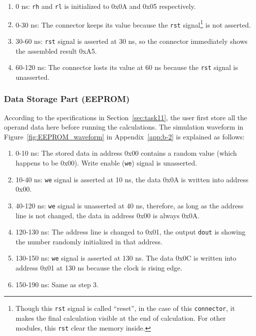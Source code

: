 \documentclass[11pt]{article}
\begin{document}
\begin{enumerate}
	\item 0 ns: \texttt{rh} and \texttt{rl} is initialized to 0x0A and 0x05 respectively.
	\item 0-30 ns: The connector keeps its value because the \texttt{rst} signal\footnote{Though this \texttt{rst} signal is called ``reset'', in the case of this \texttt{connector}, it makes the final calculation visible at the end of calculation. For other modules, this \texttt{rst} clear the memory inside.} is not asserted.
	\item 30-60 ns: \texttt{rst} signal is asserted at 30 ns, so the connector immediately shows the assembled result 0xA5.
	\item 60-120 ns: The connector losts its value at 60 ns because the \texttt{rst} signal is unasserted.
\end{enumerate}

\subsubsection{Data Storage Part (EEPROM)}

According to the specifications in Section~\ref{sec:task11}, the user first store all the operand data here before running the calculations. The simulation waveform in Figure~\ref{fig:EEPROM_waveform} in Appendix~\ref{app:b-2} is explained as follows:

\begin{enumerate}
	\item 0-10 ns: The stored data in address 0x00 contains a random value (which happens to be 0x00). Write enable (\texttt{we}) signal is unasserted.
	\item 10-40 ns: \texttt{we} signal is asserted at 10 ns, the data 0x0A is written into address 0x00.
	\item 40-120 ns: \texttt{we} signal is unasserted at 40 ns, therefore, as long as the address line is not changed, the data in address 0x00 is always 0x0A.
	\item 120-130 ns: The address line is changed to 0x01, the output \texttt{dout} is showing the number randomly initialized in that address.
	\item 130-150 ns: \texttt{we} signal is asserted at 130 ns. The data 0x0C is written into address 0x01 at 130 ns because the clock is rising edge.
	\item 150-190 ns: Same as step 3.
\end{enumerate}
\end{document}
